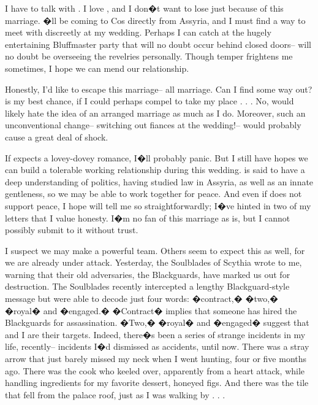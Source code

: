 \documentclass[char]{Kos}
\begin{document}
I have to talk with \cPoet{\nickname}. I love \cPoet{\them}, and I don�t want to lose \cPoet{\them} just because of this marriage. \cPoet{\They}�ll be coming to Cos directly from Assyria, and I must find a way to meet with \cPoet{\them} discreetly at my wedding. Perhaps I can catch \cPoet{\them} at the hugely entertaining Bluffmaster party that will no doubt occur behind closed doors-- \cPoet{\nickname} will no doubt be overseeing the revelries personally. Though \cPoet{\their} temper frightens me sometimes, I hope we can mend our relationship.

Honestly, I'd like to escape this marriage-- all marriage. Can I find some way out? \cPoet{\nickname} is my best chance, if I could perhaps compel \cPoet{\nickname} to take my place . . . No, \cPoet{\they} would likely hate the idea of an arranged marriage as much as I do. Moreover, such an unconventional change-- switching out fiances at the wedding!-- would probably cause a great deal of shock.

 If \cBride{\they} expects a lovey-dovey romance, I�ll probably panic. But I still have hopes we can build a tolerable working relationship during this wedding. \cBride{\They} is said to have a deep understanding of politics, having studied law in Assyria, as well as an innate gentleness, so we may be able to work together for peace. And even if \cBride{\they} does not support peace, I hope \cBride{\they} will tell me so straightforwardly; I�ve hinted in two of my letters that I value honesty. I�m no fan of this marriage as is, but I cannot possibly submit to it without trust.

I suspect we may make a powerful team. Others seem to expect this as well, for we are already under attack. Yesterday, the Soulblades of Scythia wrote to me, warning that their old adversaries, the Blackguards, have marked us out for destruction. The Soulblades recently intercepted a lengthy Blackguard-style message but were able to decode just four words: �contract,� �two,� �royal� and �engaged.� �Contract� implies that someone has hired the Blackguards for assassination. �Two,� �royal� and �engaged� suggest that \cBride{\they} and I are their targets. Indeed, there�s been a series of strange incidents in my life, recently-- incidents I�d dismissed as accidents, until now. There was a stray arrow that just barely missed my neck when I went hunting, four or five months ago. There was the cook who keeled over, apparently from a heart attack, while handling ingredients for my favorite dessert, honeyed figs. And there was the tile that fell from the palace roof, just as I was walking by . . . 
\end{document}

